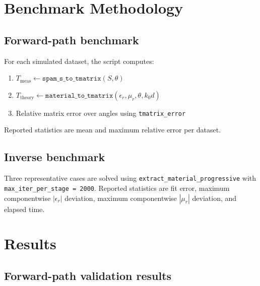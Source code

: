 \documentclass[11pt]{article}
\begin{document}
\section{Benchmark Methodology}

\subsection{Forward-path benchmark}
For each simulated dataset, the script computes:
\begin{enumerate}
    \item \(T_{\text{meas}} \leftarrow \texttt{spam\_s\_to\_tmatrix}(S,\theta)\)
    \item \(T_{\text{theory}} \leftarrow \texttt{material\_to\_tmatrix}(\epsilon_r,\mu_r,\theta,k_0d)\)
    \item Relative matrix error over angles using \texttt{tmatrix\_error}
\end{enumerate}
Reported statistics are mean and maximum relative error per dataset.

\subsection{Inverse benchmark}
Three representative cases are solved using
\texttt{extract\_material\_progressive} with \texttt{max\_iter\_per\_stage = 2000}. Reported statistics are fit error, maximum componentwise \(|\epsilon_r|\) deviation, maximum componentwise \(|\mu_r|\) deviation, and elapsed time.

\section{Results}

\subsection{Forward-path validation results}
\end{document}
